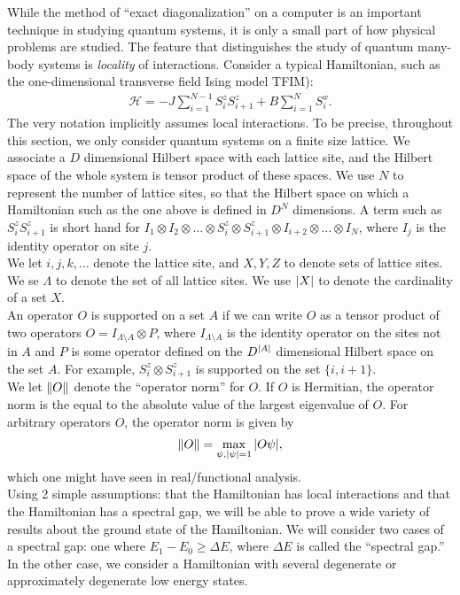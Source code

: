 \documentclass{book}
\theoremstyle{definition}
\newcommand{\had}{\mathcal{H}}
\begin{document}
While the method of ``exact diagonalization'' on a computer is an important technique in studying
quantum systems, it is only a small part of how physical problems are studied. The feature that distinguishes the study of quantum many-body systems is \textit{locality} of interactions. Consider a typical Hamiltonian, such as the one-dimensional transverse field Ising model TFIM):
\begin{align}
\had = -J \sum^{N-1}_{i=1}S^z_i S^z_{i+1} + B \sum^{N}_{i=1}S_i^x.
\end{align}
The very notation implicitly assumes local interactions. To be precise, throughout this section, we only consider quantum systems on a finite size lattice. We associate a $D$ dimensional Hilbert space with each lattice site, and the Hilbert space of the whole system is tensor product of these spaces. We use $N$ to represent the number of lattice sites, so that the Hilbert space on which a Hamiltonian such as the one above is defined in $D^N$ dimensions. A term such as $S^z_i S^z_{i+1}$ is short hand for $I_1 \otimes I_2 \otimes \dots \otimes S_i^z \otimes S^z_{i+1} \otimes I_{i+2} \otimes \dots \otimes I_N$, where $I_j$ is the identity operator on site $j$.\\

We let $i,j,k,\dots$ denote the lattice site, and $X,Y,Z$ to denote sets of lattice sites. We se $\Lambda$ to denote the set of all lattice sites. We use $\abs{X}$ to denote the cardinality of a set $X$. \\

An operator $O$ is supported on a set $A$ if we can write $O$ as a tensor product of two operators $O = I_{\Lambda\setminus A} \otimes P$, where $I_{\Lambda \setminus A}$ is the identity operator on the sites not in $A$ and $P$ is some operator defined on the $D^{\abs{A}}$ dimensional Hilbert space on the set $A$. For example, $S^z_i \otimes S^z_{i+1}$ is supported on the set $\{ i, i+1\}$. \\

We let $\norm{O}$ denote the ``operator norm'' for $O$. If $O$ is Hermitian, the operator norm is the equal to the absolute value of the largest eigenvalue of $O$. For arbitrary operators $O$, the operator norm is given by
\begin{align}
\norm{O} = \max_{\psi, \abs{\psi} = 1}  \abs{O \psi},
\end{align}
which one might have seen in real/functional analysis. \\

Using 2 simple assumptions: that the Hamiltonian has local interactions and that the Hamiltonian has a spectral gap, we will be able to prove a wide variety of results about the ground state of the Hamiltonian. We will consider two cases of a spectral gap: one where $E_1  - E_0 \geq \Delta E$, where $\Delta E$ is called the ``spectral gap.'' In the other case, we consider a Hamiltonian with several degenerate or approximately degenerate low energy states. \\
\end{document}
